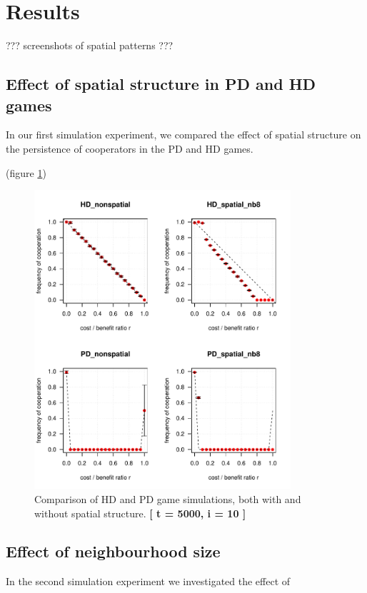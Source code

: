 
\section{Results}

??? screenshots of spatial patterns ???


\subsection{Effect of spatial structure in PD and HD games}

In our first simulation experiment, we compared the effect of spatial structure on the persistence of cooperators in the PD and HD games.


(figure \ref{fig: task1_4plot})



\begin{figure}[H]
	\centering 
	\includegraphics[width=9.5cm]{task1_4plot}
	\caption{Comparison of HD and PD game simulations, both with and without spatial structure.  \textbf{[ t = 5000, i = 10 ]} }\label{fig: task1_4plot}
\end{figure}






\subsection{Effect of neighbourhood size}

In the second simulation experiment we investigated the effect of 


